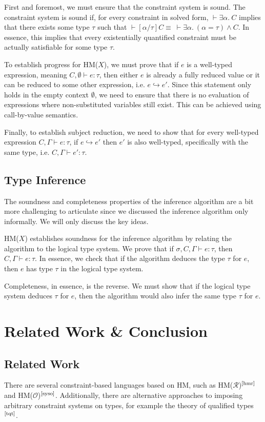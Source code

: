 \documentclass[runningheads]{llncs}
\newcommand{\hmx}{HM($X$)}
\newcommand{\hmr}{HM($\mathcal{R}$)}
\newcommand{\hmo}{HM($\mathcal{O}$)}
\begin{document}
First and foremost, we must ensure that the constraint system is sound. The
constraint system is sound if, for every constraint in solved form, $⊢ ∃α. \ C$
implies that there exists some type $τ$ such that
$⊢ [α/τ]C ≡ \ ⊢ ∃α. \ (α = τ) ∧ C$.
In essence, this implies that every existentially quantified constraint must be
actually satisfiable for some type $τ$.

To establish progress for \hmx{}, we must prove that if $e$ is a
well-typed expression, meaning $C, ∅ ⊢ e : τ$, then either $e$ is already a
fully reduced value or it can be reduced to some other expression,
i.e. $e ↪ e'$. Since this statement only holds in the empty context $∅$, we
need to ensure that there is no evaluation of expressions where non-substituted
variables still exist. This can be achieved using call-by-value semantics.

Finally, to establish subject reduction, we need to show that for every
well-typed expression $C, Γ ⊢ e : τ$, if $e ↪ e'$ then $e'$ is also well-typed,
specifically with the same type, i.e. $C, Γ ⊢ e' : τ$.

\subsection{Type Inference}
The soundness and completeness properties of the inference algorithm are a bit
more challenging to articulate since we discussed the inference algorithm only
informally. We will only discuss the key ideas.

\hmx{} establishes soundness for the inference algorithm by relating the
algorithm to the logical type system. We
prove that if $σ, C, Γ ⊢ e : τ$, then $C, Γ ⊢ e : τ$. In essence, we check
that if the algorithm deduces the type $τ$ for $e$, then $e$ has type $τ$ in
the logical type system.

Completeness, in essence, is the reverse. We must show that if the
logical type system deduces $τ$ for $e$, then the algorithm would also infer
the same type $τ$ for $e$.

\section{Related Work \& Conclusion}
\subsection{Related Work}
There are several constraint-based languages based on HM, such as
\hmr{}$^\text{\cite{hmr}}$ and \hmo{}$^\text{\cite{syso}}$.
Additionally, there are alternative approaches to imposing arbitrary constraint
systems on types, for example the theory of qualified types$^\text{\cite{tqt}}$.
\end{document}
